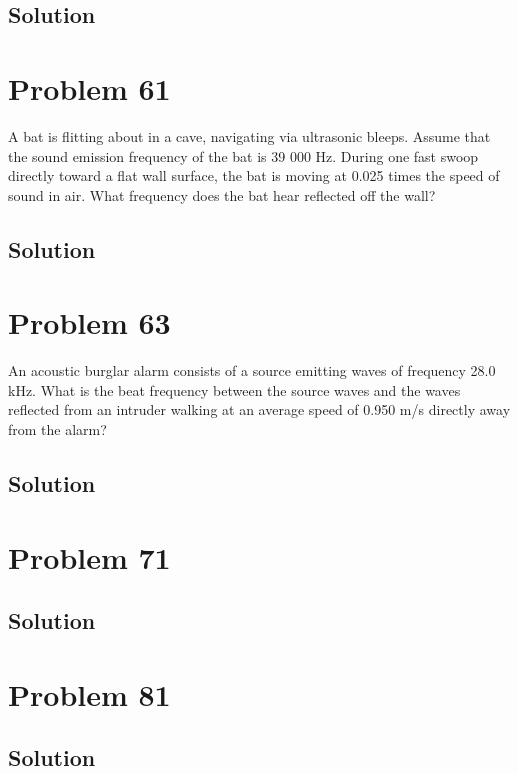\documentclass[12pt]{article}
\begin{document}
        \subsection{Solution}

    \pagebreak
    \section{Problem 61}
        A bat is flitting about in a cave, navigating via ultrasonic bleeps. 
        Assume that the sound emission frequency of the bat is 39 000 Hz. 
        During one fast swoop directly toward a flat wall surface, the bat is moving at 0.025 times the speed of sound in air. 
        What frequency does the bat hear reflected off the wall?

        \subsection{Solution}

    \pagebreak
    \section{Problem 63}
        An acoustic burglar alarm consists of a source emitting waves of frequency 28.0 kHz. 
        What is the beat frequency between the source waves and the waves reflected from an intruder walking at an average speed of 0.950 m/s directly away from the alarm?

        \subsection{Solution}

    \pagebreak
    \section{Problem 71}

        \subsection{Solution}

    \pagebreak
    \section{Problem 81}

        \subsection{Solution}
\end{document}
